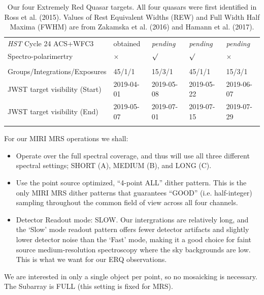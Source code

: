 \begin{table}[h]
\begin{center}
\begin{tabular}{||  l|l|l|l|l ||}
  {\it HST} Cycle 24  ACS+WFC3  %
                                       & obtained  &  {\it pending}   &{\it pending}  & {\it pending} \\
  Spectro-polarimertry       &   $\times$            &  $\surd$                &  $\surd$           & $\times$  \\
 &&&& \\
Groups/Integrations/Exposures      &  45/1/1              &   15/3/1  &   45/1/1         &   15/3/1         \\
JWST target visibility (Start) & 2019-04-01    & 2019-05-08    & 2019-05-22   & 2019-06-07  \\ 
JWST target visibility (End)  & 2019-05-07    & 2019-07-01     & 2019-07-15   & 2019-07-29   \\ 
 &&&& \\
\hline\hline
      \end{tabular}
\caption{
Our four Extremely Red Quasar targets. All four quasars were first
identified in Ross et al. (2015).  Values of Rest Equivalent Widths
(REW) and Full Width Half Maxima (FWHM) are from Zakamska et
al. (2016) and Hamann et al. (2017).
}
\label{tab:targets} 
  \end{center}
\end{table}

\vspace{-8pt}
\noindent
For our MIRI MRS operations we shall: 
\begin{itemize}
    \item Operate over the full spectral coverage, and thus will use all three different spectral settings;  
      SHORT (A), MEDIUM (B), and LONG (C). 
    \item Use the point source optimized, ``4-point ALL'' dither pattern.
      This is the only MIRI MRS dither patterns that guarantees ``GOOD''
      (i.e. half-integer) sampling throughout the common field of view
      across all four channels.
    \item{Detector Readout mode: SLOW. 
        Our intergrations are relatively long, and the `Slow' mode readout pattern offers fewer detector
        artifacts and slightly lower detector noise than the `Fast' mode,  
        making it a good choice for faint source medium-resolution
        spectroscopy where the sky backgrounds are low. 
        This is what we want for our ERQ observations.}
\end{itemize}
We are interested in only a single object per point, so no mosaicking is necessary.  
The Subarray is FULL (this setting is fixed for MRS). 

